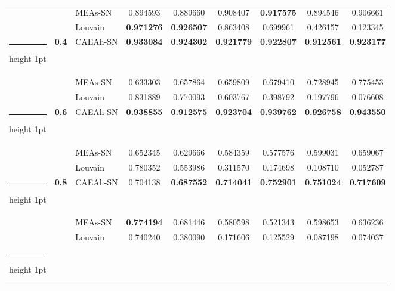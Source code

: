 \documentclass[10pt, journal]{IEEEtran}
\makeatletter
\newcommand{\thickhline}{%
    \noalign {\ifnum 0=`}\fi \hrule height 1pt
    \futurelet \reserved@a \@xhline
}
\makeatother
\begin{document}
\begin{table}[!htbp]
\begin{tabular}{|c|c|l|c|c|c|c|c|c|}
                              &                               & MEAs-SN & 0.894593          & 0.889660           & 0.908407          & \textbf{0.917575} & 0.894546          & 0.906661          \\ \cline{3-9}
                              &                               & Louvain  & \textbf{0.971276} & \textbf{0.926507} & 0.863408          & 0.699961          & 0.426157          & 0.123345          \\ \thickhline
\multirow{3}{*}{\textbf{0.3}} & \multirow{3}{*}{\textbf{0.4}} & CAEAh-SN & \textbf{0.933084} & \textbf{0.924302} & \textbf{0.921779} & \textbf{0.922807} & \textbf{0.912561} & \textbf{0.923177} \\ \cline{3-9}
                              &                               & MEAs-SN & 0.633303          & 0.657864          & 0.659809          & 0.679410          & 0.728945          & 0.775453          \\ \cline{3-9}
                              &                               & Louvain  & 0.831889          & 0.770093          & 0.603767          & 0.398792          & 0.197796          & 0.076608         \\ \thickhline
\multirow{3}{*}{\textbf{0.3}} & \multirow{3}{*}{\textbf{0.6}} & CAEAh-SN & \textbf{0.938855} & \textbf{0.912575} & \textbf{0.923704} & \textbf{0.939762} & \textbf{0.926758} & \textbf{0.943550}  \\ \cline{3-9}
                              &                               & MEAs-SN & 0.652345          & 0.629666          & 0.584359          & 0.577576          & 0.599031          & 0.659067          \\ \cline{3-9}
                              &                               & Louvain  & 0.780352          & 0.553986          & 0.311570           & 0.174698          & 0.108710           & 0.052787         \\ \thickhline
\multirow{3}{*}{\textbf{0.3}} & \multirow{3}{*}{\textbf{0.8}} & CAEAh-SN & 0.704138          & \textbf{0.687552} & \textbf{0.714041} & \textbf{0.752901} & \textbf{0.751024} & \textbf{0.717609} \\ \cline{3-9}
                              &                               & MEAs-SN & \textbf{0.774194} & 0.681446          & 0.580598          & 0.521343          & 0.598653          & 0.636236          \\ \cline{3-9}
                              &                               & Louvain  & 0.740240           & 0.380090           & 0.171606          & 0.125529          & 0.087198         & 0.074037         \\ \thickhline

\end{tabular}
\end{table}
\end{document}

